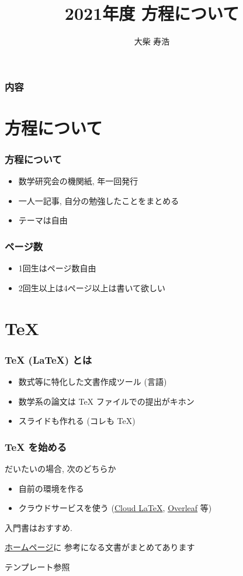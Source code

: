 \documentclass[dvipdfmx,12pt,aspectratio=169]{beamer}%
\begin{document}
    
\title{2021年度 方程について}
\author{大柴 寿浩}


\begin{frame}
    \titlepage
\end{frame}

\begin{frame}\frametitle{内容}
    \tableofcontents
\end{frame}

\section{方程について}

\begin{frame}\frametitle{方程について}
    \begin{itemize}
        \item 数学研究会の機関紙, 年一回発行
        \item 一人一記事, 自分の勉強したことをまとめる
        \item テーマは自由
    \end{itemize}
\end{frame}

\begin{frame}\frametitle{ページ数}
    \begin{itemize}
        \item 1回生はページ数自由
        \item 2回生以上は4ページ以上は書いて欲しい
    \end{itemize}
\end{frame}


\section{TeX}

\begin{frame}\frametitle{TeX (LaTeX) とは}
    \begin{itemize}
        \item 数式等に特化した文書作成ツール (言語)
        \item 数学系の論文は TeX ファイルでの提出がキホン
        \item スライドも作れる (コレも TeX)
    \end{itemize}
\end{frame}

\begin{frame}\frametitle{TeX を始める}
    だいたいの場合, 次のどちらか
    \begin{itemize}
        \item 自前の環境を作る
        \item クラウドサービスを使う 
        (\href{https://cloudlatex.io/ja}{Cloud LaTeX}, 
        \href{https://ja.overleaf.com/}{Overleaf} 等)
    \end{itemize}
    入門書\cite{1}はおすすめ. 
    
    \href{https://toshi2019.github.io}{ホームページ}に
    参考になる文書がまとめてあります

    テンプレート参照
\end{frame}
\end{document}
